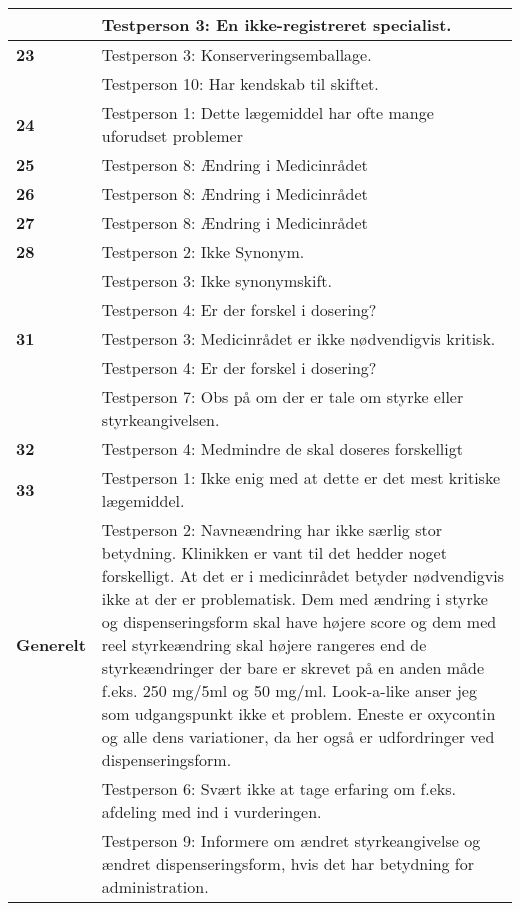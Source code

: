 \begin{table}[H]
\begin{tabular}{p{2.2cm}|p{12cm}}
\cellcolor[HTML]{C0C0C0}          & Testperson 3: En ikke-registreret specialist. \\ \hline
\cellcolor[HTML]{C0C0C0} \textbf{23}\multirow{2}{*}{} & Testperson 3: Konserveringsemballage. \\ \cline{2-2}
\cellcolor[HTML]{C0C0C0}           & Testperson 10: Har kendskab til skiftet. \\ \hline
\cellcolor[HTML]{C0C0C0} \textbf{24} & Testperson 1: Dette lægemiddel har ofte mange uforudset problemer \\ \hline
\cellcolor[HTML]{C0C0C0} \textbf{25} & Testperson 8: Ændring i Medicinrådet \\ \hline
\cellcolor[HTML]{C0C0C0} \textbf{26} & Testperson 8: Ændring i Medicinrådet \\ \hline
\cellcolor[HTML]{C0C0C0}   \textbf{27} & Testperson 8: Ændring i Medicinrådet \\ \hline
\cellcolor[HTML]{C0C0C0} \textbf{28}\multirow{3}{*}{} & Testperson 2: Ikke Synonym. \\ \cline{2-2}
\cellcolor[HTML]{C0C0C0}      & Testperson 3: Ikke synonymskift. \\ \cline{2-2}
 \cellcolor[HTML]{C0C0C0}                    & Testperson 4: Er der forskel i dosering? \\ \hline
\cellcolor[HTML]{C0C0C0} \textbf{31}\multirow{3}{*}{} & Testperson 3: Medicinrådet er ikke nødvendigvis kritisk. \\ \cline{2-2}
\cellcolor[HTML]{C0C0C0}     & Testperson 4: Er der forskel i dosering? \\ \cline{2-2}
\cellcolor[HTML]{C0C0C0}   & Testperson 7: Obs på om der er tale om styrke eller styrkeangivelsen. \\ \hline
\cellcolor[HTML]{C0C0C0}  \textbf{32} & Testperson 4: Medmindre de skal doseres forskelligt \\ \hline
\cellcolor[HTML]{C0C0C0} \textbf{33} & Testperson 1: Ikke enig med at dette er det mest kritiske lægemiddel. \\ \hline
\cellcolor[HTML]{C0C0C0} \textbf{Generelt}\multirow{3}{*} & Testperson 2: Navneændring har ikke særlig stor betydning. Klinikken er vant til det hedder noget forskelligt. At det er i medicinrådet betyder nødvendigvis ikke at der er problematisk. Dem med ændring i styrke og dispenseringsform skal have højere score og dem med reel styrkeændring skal højere rangeres end de styrkeændringer der bare er skrevet på en anden måde f.eks. 250 mg/5ml og 50 mg/ml. Look-a-like anser jeg som udgangspunkt ikke et problem. Eneste er oxycontin og alle dens variationer, da her også er udfordringer ved dispenseringsform.  \\ \cline{2-2}
\cellcolor[HTML]{C0C0C0}    & Testperson 6: Svært ikke at tage erfaring om f.eks. afdeling med ind i vurderingen. \\ \cline{2-2}
\cellcolor[HTML]{C0C0C0}                & Testperson 9: Informere om ændret styrkeangivelse og ændret dispenseringsform, hvis det har betydning for administration. \\ 
\end{tabular}
\end{table}

